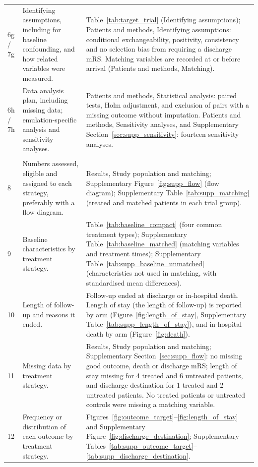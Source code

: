 {\begin{longtable}{p{1.0cm} p{4.6cm} p{10.4cm}}
6g / 7g & Identifying assumptions, including for baseline confounding, and how related variables were measured. & Table~\ref{tab:target_trial} (Identifying assumptions); Patients and methods, Identifying assumptions: conditional exchangeability, positivity, consistency and no selection bias from requiring a discharge mRS. Matching variables are recorded at or before arrival (Patients and methods, Matching). \\
6h / 7h & Data analysis plan, including missing data; emulation-specific analysis and sensitivity analyses. & Patients and methods, Statistical analysis: paired tests, Holm adjustment, and exclusion of pairs with a missing outcome without imputation. Patients and methods, Sensitivity analyses, and Supplementary Section~\ref{sec:supp_sensitivity}: fourteen sensitivity analyses. \\
\addlinespace
\multicolumn{3}{l}{\textbf{Results}}\\
8 & Numbers assessed, eligible and assigned to each strategy, preferably with a flow diagram. & Results, Study population and matching; Supplementary Figure~\ref{fig:supp_flow} (flow diagram); Supplementary Table~\ref{tab:supp_matching} (treated and matched patients in each trial group). \\
9 & Baseline characteristics by treatment strategy. & Table~\ref{tab:baseline_compact} (four common treatment types); Supplementary Table~\ref{tab:baseline_matched} (matching variables and treatment times); Supplementary Table~\ref{tab:supp_baseline_unmatched} (characteristics not used in matching, with standardised mean differences). \\
10 & Length of follow-up and reasons it ended. & Follow-up ended at discharge or in-hospital death. Length of stay (the length of follow-up) is reported by arm (Figure~\ref{fig:length_of_stay}, Supplementary Table~\ref{tab:supp_length_of_stay}), and in-hospital death by arm (Figure~\ref{fig:death}). \\
11 & Missing data by treatment strategy. & Results, Study population and matching; Supplementary Section~\ref{sec:supp_flow}: no missing good outcome, death or discharge mRS; length of stay missing for 4 treated and 6 untreated patients, and discharge destination for 1 treated and 2 untreated patients. No treated patients or untreated controls were missing a matching variable. \\
12 & Frequency or distribution of each outcome by treatment strategy. & Figures~\ref{fig:outcome_target}--\ref{fig:length_of_stay} and Supplementary Figure~\ref{fig:discharge_destination}; Supplementary Tables~\ref{tab:supp_outcome_target}--\ref{tab:supp_discharge_destination}. \\

\end{longtable}}
